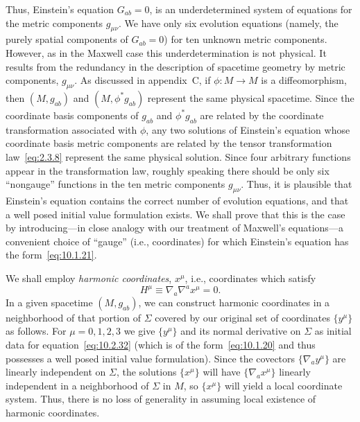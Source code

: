 Thus, Einstein's equation \(G_{ab}=0\), is an underdetermined system of equations for
the metric components \(g_{\mu\nu}\). We have only six evolution equations (namely,
the purely spatial components of \(G_{ab}=0\)) for ten unknown metric components.
However, as in the Maxwell case this underdetermination is not physical. It results
from the redundancy in the description of spacetime geometry by metric components,
\(g_{\mu\nu}\). As discussed in appendix~C, if \(\phi:M\to M\) is a diffeomorphism,
then \((M,g_{ab})\) and \((M,\phi^*g_{ab})\) represent the same physical spacetime.
Since the coordinate basis components of \(g_{ab}\) and \(\phi^*g_{ab}\) are related by
the coordinate transformation associated with \(\phi\), any two solutions of Einstein's
equation whose coordinate basis metric components are related by the tensor
transformation law~\eqref{eq:2.3.8} represent the same physical solution. Since four
arbitrary functions appear in the transformation law, roughly speaking there should
be only six ``nongauge'' functions in the ten metric components \(g_{\mu\nu}\). Thus,
it is plausible that Einstein's equation contains the correct number of evolution
equations, and that a well posed initial value formulation exists. We shall prove that
this is the case by introducing---in close analogy with our treatment of Maxwell's
equations---a convenient choice of ``gauge'' (i.e., coordinates) for which Einstein's
equation has the form~\eqref{eq:10.1.21}.

We shall employ \emph{harmonic coordinates}, \(x^\mu\), i.e., coordinates which satisfy
\begin{equation}
  H^\mu\equiv\nabla_a\nabla^ax^\mu=0.
  \tag{10.2.32}\label{eq:10.2.32}
\end{equation}
In a given spacetime \((M,g_{ab})\), we can construct harmonic coordinates in a
neighborhood of that portion of \(\Sigma\) covered by our original set of coordinates
\(\{y^\mu\}\) as follows. For \(\mu=0,1,2,3\) we give \(\{y^\mu\}\) and its normal
derivative on \(\Sigma\) as initial data for equation~\eqref{eq:10.2.32} (which is of
the form~\eqref{eq:10.1.20} and thus possesses a well posed initial value formulation).
Since the covectors \(\{\nabla_ay^\mu\}\) are linearly independent on \(\Sigma\), the
solutions \(\{x^\mu\}\) will have \(\{\nabla_ax^\mu\}\) linearly independent in a
neighborhood of \(\Sigma\) in \(M\), so \(\{x^\mu\}\) will yield a local coordinate
system. Thus, there is no loss of generality in assuming local existence of harmonic
coordinates.

